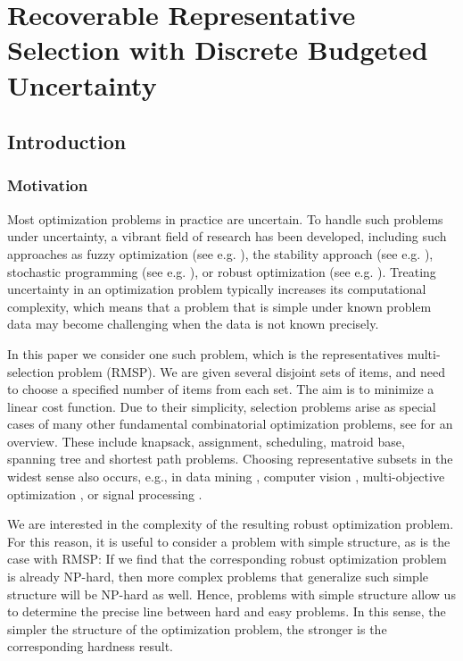 \chapter{Recoverable Representative Selection with Discrete Budgeted Uncertainty}
\label{ch:recov-selection}

\section{Introduction}\label{sec:intro}


\subsection{Motivation}

Most optimization problems in practice are uncertain. To handle such problems under uncertainty, a vibrant field of research has been developed, including such approaches as fuzzy optimization (see e.g. \cite{lodwick2010fuzzy,klir1995fuzzy}), the stability approach (see e.g. \cite{sotskov2014sequencing}), stochastic programming (see e.g. \cite{birge2011introduction}), or robust optimization (see e.g. \cite{kasperski2016robust}). Treating uncertainty in an optimization problem typically increases its computational complexity, which means that a problem that is simple under known problem data may become challenging when the data is not known precisely.

In this paper we consider one such problem, which is the representatives multi-selection problem (RMSP). We are given several disjoint sets of items, and need to choose a specified number of items from each set. The aim is to minimize a linear cost function. Due to their simplicity, selection problems arise as special cases of many other fundamental combinatorial optimization problems, see \cite{kasperski2013approximating} for an overview. These include knapsack, assignment, scheduling, matroid base, spanning tree and shortest path problems. Choosing representative subsets in the widest sense also occurs, e.g., in data mining \cite{daszykowski2002representative,wang2017representative}, computer vision \cite{meng2016keyframes}, multi-objective optimization \cite{zio2011clustering}, or signal processing \cite{wang2015novel}.

We are interested in the complexity of the resulting robust optimization problem. For this reason, it is useful to consider a problem with simple structure, as is the case with RMSP: If we find that the corresponding robust optimization problem is already NP-hard, then more complex problems that generalize such simple structure will be NP-hard as well. Hence, problems with simple structure allow us to determine the precise line between hard and easy problems. In this sense, the simpler the structure of the optimization problem, the stronger is the corresponding hardness result.

